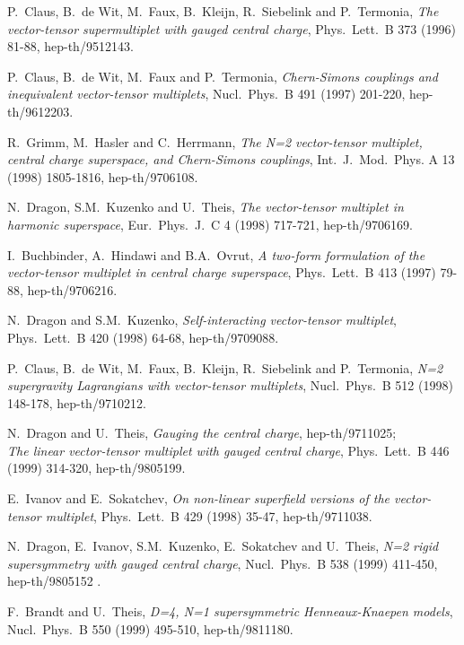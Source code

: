 \documentclass[a4paper,12pt]{article}
\begin{document}
\begin{thebibliography}{30}

P.\ Claus, B.\ de Wit, M.\ Faux, B.\ Kleijn, R.\ Siebelink and P.\ Termonia,
{\it The vector-tensor supermultiplet with gauged central charge},
Phys.\ Lett.\ B 373 (1996) 81-88,
hep-th/9512143.

P.\ Claus, B.\ de Wit, M.\ Faux and P.\ Termonia,
{\it Chern-Simons couplings and inequivalent vector-tensor multiplets},
Nucl.\ Phys.\ B 491 (1997) 201-220,
hep-th/9612203.

R.\ Grimm, M.\ Hasler and C.\ Herrmann,
{\it The N=2 vector-tensor multiplet, central charge superspace, 
and Chern-Simons couplings},
Int.\ J.\ Mod.\ Phys. A 13 (1998) 1805-1816,
hep-th/9706108.

N.\ Dragon, S.M.\ Kuzenko and U.\ Theis, 
{\it The vector-tensor multiplet in harmonic superspace},
Eur.\ Phys.\ J.\ C 4 (1998) 717-721,
hep-th/9706169.

I.\ Buchbinder, A.\ Hindawi and B.A.\ Ovrut, 
{\it A two-form formulation of the vector-tensor multiplet 
in central charge superspace},
Phys.\ Lett.\ B 413 (1997) 79-88,
hep-th/9706216.

N.\ Dragon and S.M.\ Kuzenko, 
{\it Self-interacting vector-tensor multiplet},
Phys.\ Lett.\ B 420 (1998) 64-68,
hep-th/9709088.

P.\ Claus, B.\ de Wit, M.\ Faux, B.\ Kleijn, R.\ Siebelink and P.\ Termonia,
{\it N=2 supergravity Lagrangians with vector-tensor multiplets},
Nucl.\ Phys.\ B 512 (1998) 148-178,
hep-th/9710212.

N.\ Dragon and U.\ Theis, 
{\it Gauging the central charge}, hep-th/9711025;\\
{\it The linear vector-tensor multiplet with gauged central charge},
Phys.\ Lett.\ B 446 (1999) 314-320,
hep-th/9805199.

E.\ Ivanov and E.\ Sokatchev, 
{\it On non-linear superfield versions of the vector-tensor multiplet},
Phys.\ Lett.\ B 429 (1998) 35-47,
hep-th/9711038.

N.\ Dragon, E.\ Ivanov, S.M.\ Kuzenko, E.\ Sokatchev and U.\ Theis, 
{\it N=2 rigid supersymmetry with gauged central charge},
Nucl.\ Phys.\ B 538 (1999) 411-450,
hep-th/9805152 .

F.\ Brandt and U.\ Theis, 
{\it D=4, N=1 supersymmetric Henneaux-Knaepen models},
Nucl.\ Phys.\ B 550 (1999) 495-510,
hep-th/9811180.


\end{thebibliography}
\end{document}

